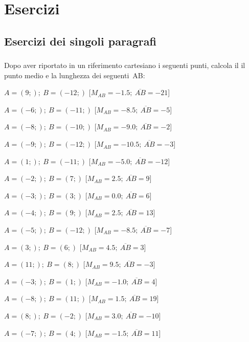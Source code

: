 
\section{Esercizi}

\subsection{Esercizi dei singoli paragrafi}

\subsubsection*{}

\begin{esercizio}\label{ese:03.1}
Dopo aver riportato in un riferimento cartesiano i seguenti punti,
calcola il il punto medio e la lunghezza dei seguenti~AB:
 \begin{enumeratea}
  \item  $ A=(9;); ~B=(-12;)$ \hfill [$M_{AB}=-1.5; ~\overline{AB}=-21$]
  \item  $ A=(-6;); ~B=(-11;)$ \hfill [$M_{AB}=-8.5; ~\overline{AB}=-5$]
  \item  $ A=(-8;); ~B=(-10;)$ \hfill [$M_{AB}=-9.0; ~\overline{AB}=-2$]
  \item  $ A=(-9;); ~B=(-12;)$ \hfill [$M_{AB}=-10.5; ~\overline{AB}=-3$]
  \item  $ A=(1;); ~B=(-11;)$ \hfill [$M_{AB}=-5.0; ~\overline{AB}=-12$]
  \item  $ A=(-2;); ~B=(7;)$ \hfill [$M_{AB}=2.5; ~\overline{AB}=9$]
  \item  $ A=(-3;); ~B=(3;)$ \hfill [$M_{AB}=0.0; ~\overline{AB}=6$]
  \item  $ A=(-4;); ~B=(9;)$ \hfill [$M_{AB}=2.5; ~\overline{AB}=13$]
  \item  $ A=(-5;); ~B=(-12;)$ \hfill [$M_{AB}=-8.5; ~\overline{AB}=-7$]
  \item  $ A=(3;); ~B=(6;)$ \hfill [$M_{AB}=4.5; ~\overline{AB}=3$]
  \item  $ A=(11;); ~B=(8;)$ \hfill [$M_{AB}=9.5; ~\overline{AB}=-3$]
  \item  $ A=(-3;); ~B=(1;)$ \hfill [$M_{AB}=-1.0; ~\overline{AB}=4$]
  \item  $ A=(-8;); ~B=(11;)$ \hfill [$M_{AB}=1.5; ~\overline{AB}=19$]
  \item  $ A=(8;); ~B=(-2;)$ \hfill [$M_{AB}=3.0; ~\overline{AB}=-10$]
  \item  $ A=(-7;); ~B=(4;)$ \hfill [$M_{AB}=-1.5; ~\overline{AB}=11$]
 \end{enumeratea}
\end{esercizio}


